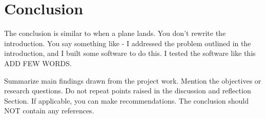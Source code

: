 \section{Conclusion}\label{conc}

The conclusion  is similar to when a plane lands. 
You don't rewrite the introduction. You say something like - I addressed the problem outlined in the introduction, and I built some software to do this. I tested the software like this ADD FEW WORDS. 

Summarize main findings drawn from the project work. Mention the objectives or research questions. 
Do not repeat points raised in the discussion and reflection Section. If applicable, you can make recommendations. The conclusion should NOT contain any references.

